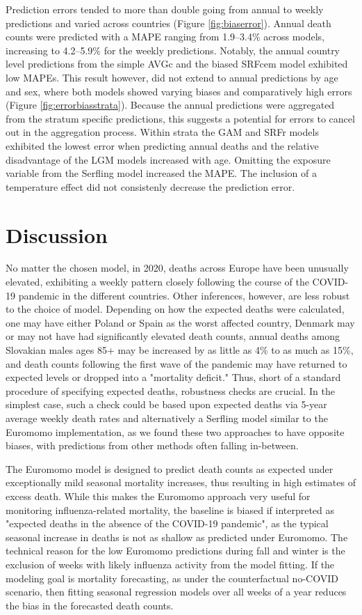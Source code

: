\documentclass[12pt]{article}
\begin{document}
Prediction errors tended to more than double going from annual to weekly predictions and varied across countries (Figure \ref{fig:biaserror}). Annual death counts were predicted with a MAPE ranging from 1.9--3.4\% across models, increasing to 4.2--5.9\% for the weekly predictions. Notably, the annual country level predictions from the simple AVGc and the biased SRFcem model exhibited low MAPEs. This result however, did not extend to annual predictions by age and sex, where both models showed varying biases and comparatively high errors (Figure \ref{fig:errorbiasstrata}). Because the annual predictions were aggregated from the stratum specific predictions, this suggests a potential for errors to cancel out in the aggregation process. Within strata the GAM and SRFr models exhibited the lowest error when predicting annual deaths and the relative disadvantage of the LGM models increased with age. Omitting the exposure variable from the Serfling model increased the MAPE. The inclusion of a temperature effect did not consistenly decrease the prediction error.

\section*{Discussion}

No matter the chosen model, in 2020, deaths across Europe have been unusually elevated, exhibiting a weekly pattern closely following the course of the COVID-19 pandemic in the different countries. Other inferences, however, are less robust to the choice of model. Depending on how the expected deaths were calculated, one may have either Poland or Spain as the worst affected country, Denmark may or may not have had significantly elevated death counts, annual deaths among Slovakian males ages 85+ may be increased by as little as 4\% to as much as 15\%, and death counts following the first wave of the pandemic may have returned to expected levels or dropped into a "mortality deficit." Thus, short of a standard procedure of specifying expected deaths, robustness checks are crucial. In the simplest case, such a check could be based upon expected deaths via 5-year average weekly death rates and alternatively a Serfling model similar to the Euromomo implementation, as we found these two approaches to have opposite biases, with predictions from other methods often falling in-between.

The Euromomo model is designed to predict death counts as expected under exceptionally mild seasonal mortality increases, thus resulting in high estimates of excess death. While this makes the Euromomo approach very useful for monitoring influenza-related mortality, the baseline is biased if interpreted as "expected deaths in the absence of the COVID-19 pandemic", as the typical seasonal increase in deaths is not as shallow as predicted under Euromomo. The technical reason for the low Euromomo predictions during fall and winter is the exclusion of weeks with likely influenza activity from the model fitting. If the modeling goal is mortality forecasting, as under the counterfactual no-COVID scenario, then fitting seasonal regression models over all weeks of a year reduces the bias in the forecasted death counts.
\end{document}
